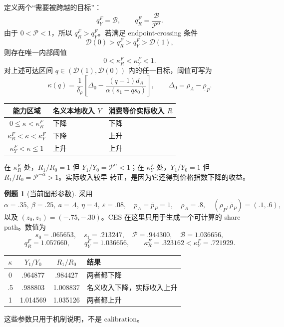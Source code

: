 \documentclass[UTF8,11pt,scheme=chinese,fontset=fandol]{ctexart}
\newcommand{\calB}{\mathcal B}
\newcommand{\calD}{\mathcal D}
\newcommand{\calP}{\mathcal P}
\theoremstyle{definition}
\newtheorem{workedexample}{例题}[section]
\begin{document}
定义两个“需要被跨越的目标”：
\[
q_Y^F=\calB,
\qquad
q_R^F=\frac{\calB}{\calP^\alpha}.
\]
由于 \(0<\calP<1\)，所以 \(q_R^F>q_Y^F\)。若满足 endpoint-crossing 条件
\[
\boxed{\calD(0)>q_R^F>q_Y^F>\calD(1),}
\]
则存在唯一内部阈值
\[
0<\kappa_R^F<\kappa_Y^F<1.
\]
对上述可达区间 \(q\in(\calD(1),\calD(0))\) 内的任一目标，阈值可写为
\[
\kappa(q)=\frac1{\delta_\rho}
\left[\Delta_0-
\frac{(q-1)d_A}{\alpha(s_1-qs_0)}\right],
\qquad
\Delta_0=\rho_A-\underline\rho_P.
\]

\begin{center}
\small
\begin{tabular}{cll}
\toprule
能力区域 & 名义本地收入 \(Y\) & 消费等价实际收入 \(R\) \\
\midrule
\(0\leq\kappa<\kappa_R^F\) & 下降 & 下降 \\
\(\kappa_R^F<\kappa<\kappa_Y^F\) & 下降 & 上升 \\
\(\kappa_Y^F<\kappa\leq1\) & 上升 & 上升 \\
\bottomrule
\end{tabular}
\end{center}

在 \(\kappa_R^F\) 处，\(R_1/R_0=1\) 但 \(Y_1/Y_0=\calP^\alpha<1\)；在
\(\kappa_Y^F\) 处，\(Y_1/Y_0=1\) 但 \(R_1/R_0=\calP^{-\alpha}>1\)。实际收入较早
转正，是因为它还得到价格指数下降的收益。

\begin{workedexample}[当前图形参数]
采用
\[
\alpha=.35,\ \beta=.25,\ a=.4,\ \eta=4,\ \varepsilon=.08,
\quad p_A=\bar p_P=1,
\quad \rho_A=.8,
\quad (\underline\rho_P,\overline\rho_P)=(.1,.6),
\]
以及 \((z_0,z_1)=(-.75,-.30)\)。CES 在这里只用于生成一个可计算的 share path。数值为
\[
s_0=.065653,\quad s_1=.213247,\quad
\calP=.944300,\quad \calB=1.036656,
\]
\[
q_R^F=1.057660,\qquad q_Y^F=1.036656,
\qquad
\boxed{\kappa_R^F=.323162<\kappa_Y^F=.721929.}
\]

\begin{center}
\begin{tabular}{cccl}
\toprule
\(\kappa\) & \(Y_1/Y_0\) & \(R_1/R_0\) & 结果 \\
\midrule
0 & .964877 & .984427 & 两者都下降 \\
.5 & .988803 & 1.008837 & 名义收入下降，实际收入上升 \\
1 & 1.014569 & 1.035126 & 两者都上升 \\
\bottomrule
\end{tabular}
\end{center}
这些参数只用于机制说明，不是 calibration。
\end{workedexample}
\end{document}
